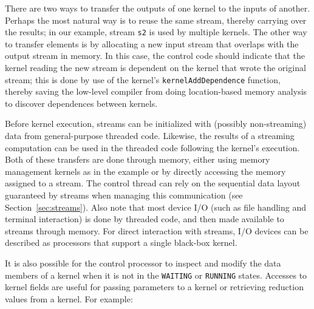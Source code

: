 
There are two ways to transfer the outputs of one kernel to the inputs of another.  Perhaps the most natural way is to reuse the same stream, thereby carrying over the results; in our example, stream {\tt s2} is used by multiple kernels.  The other way to transfer elements is by allocating a new input stream that overlaps with the output stream in memory.  In this case, the control code should indicate that the kernel reading the new stream is dependent on the kernel that wrote the original stream; this is done by use of the kernel's {\tt kernelAddDependence} function, thereby saving the low-level compiler from doing location-based memory analysis to discover dependences between kernels.


Before kernel execution, streams can be initialized with (possibly
non-streaming) data from general-purpose threaded code.  Likewise, the results of a streaming computation can be used in the threaded code following the kernel's execution.  Both of these transfers are done through memory, either using memory management kernels as in the example  or by directly accessing the memory assigned to a stream.  The control thread can rely on the sequential data layout guaranteed by streams when managing this communication (see Section~\ref{sec:streams}). 
Also note that most device I/O (such as file handling and terminal interaction) is done 
by threaded code, and then made available to streams through memory.  
For direct interaction with streams, I/O devices can be described as 
processors that support a single black-box kernel.

It is also possible for the control processor to inspect and modify the data members of a kernel when it is not in the 
{\tt WAITING} or {\tt RUNNING} states. Accesses to kernel fields are 
useful for passing parameters to a kernel or retrieving reduction 
values from a kernel.  For example: 

